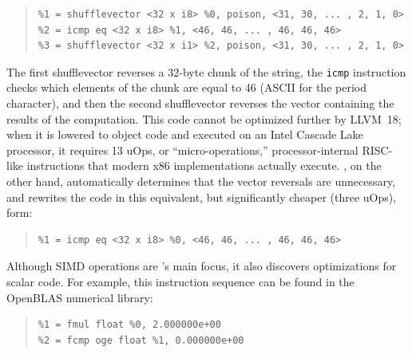 {\begin{quote}
\begin{verbatim}
%1 = shufflevector <32 x i8> %0, poison, <31, 30, ... , 2, 1, 0>
%2 = icmp eq <32 x i8> %1, <46, 46, ... , 46, 46, 46>
%3 = shufflevector <32 x i1> %2, poison, <31, 30, ... , 2, 1, 0>
\end{verbatim}
\end{quote}}


The first shufflevector reverses a 32-byte chunk of the string, the
\texttt{icmp} instruction checks which elements of the chunk are equal
to 46 (ASCII for the period character), and then the second
shufflevector reverses the vector containing the results of the
computation.
%
This code cannot be optimized further by LLVM~18; when it is lowered to
object code and executed on an Intel Cascade Lake processor, it
requires 13 uOps, or ``micro-operations,'' processor-internal
RISC-like instructions that modern x86 implementations actually
execute.
%
\minotaur{}, on the other hand, automatically determines that the vector
reversals are unnecessary, and rewrites the code in this equivalent,
but significantly cheaper (three uOps), form:

{\begin{quote}
\begin{verbatim}
%1 = icmp eq <32 x i8> %0, <46, 46, ... , 46, 46, 46>
\end{verbatim}
\end{quote}}



Although SIMD operations are \minotaur's main focus, it also discovers
optimizations for scalar code.
%
For example, this instruction sequence can be found in the OpenBLAS
numerical library:

{\begin{quote}
\begin{verbatim}
%1 = fmul float %0, 2.000000e+00
%2 = fcmp oge float %1, 0.000000e+00
\end{verbatim}
\end{quote}}

